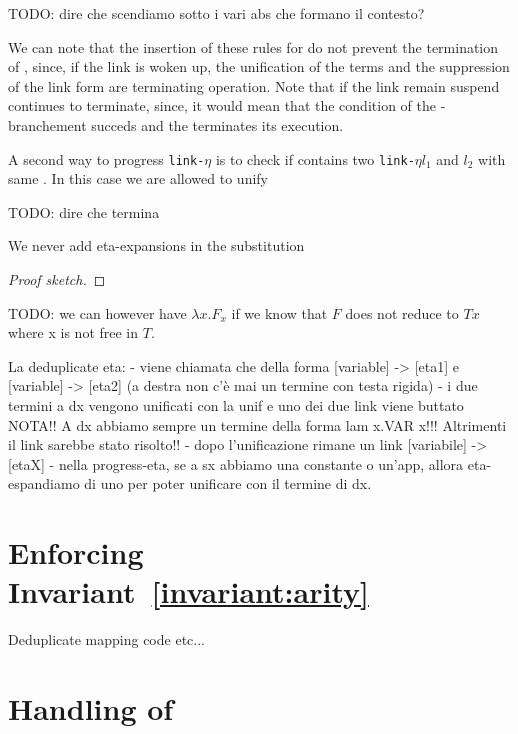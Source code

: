 \documentclass[sigconf,natbib=false,review]{acmart}
\newcommand{\linketa}{\texttt{link-}\ensuremath{\eta}\xspace}
\begin{document}
TODO: dire che scendiamo sotto i vari abs che formano il contesto? 

We can note that the insertion of these rules for  do not
prevent the termination of , since, if the link is woken up,
the unification of the terms and the suppression of the link form \linkStore
are terminating operation. Note that if the link remain suspend
 continues to terminate, since, it would mean that the
condition of the -branchement succeds and the 
terminates its execution.

A second way to progress \linketa is to check if \linkStore contains two
\linketa $l_1$ and $l_2$ with same \lhs. In this case we are allowed to unify


TODO: dire che termina


\begin{lemma}
  We never add eta-expansions in the substitution
\end{lemma}

\begin{proof}[Proof sketch]
\end{proof}



TODO: we can however have $\lambda x. F_x$ if we know that $F$ does not reduce
to $T x$ where x is not free in $T$.

\begin{textcode}
  La deduplicate eta:
  - viene chiamata che della forma [variable] -> [eta1] e [variable] -> [eta2]
    (a destra non c'è mai un termine con testa rigida)
  - i due termini a dx vengono unificati con la unif e uno dei due link viene buttato
    NOTA!! A dx abbiamo sempre un termine della forma lam x.VAR x!!!
    Altrimenti il link sarebbe stato risolto!!
  - dopo l'unificazione rimane un link [variabile] -> [etaX]
  - nella progress-eta, se a sx abbiamo una constante o un'app, allora eta-espandiamo
    di uno per poter unificare con il termine di dx.
\end{textcode}

\section{Enforcing Invariant~\ref{invariant:arity}}
\label{sec:invariant1}
Deduplicate mapping code etc...
  
\section{Handling of \maybebeta}\label{sec:beta}
\end{document}
